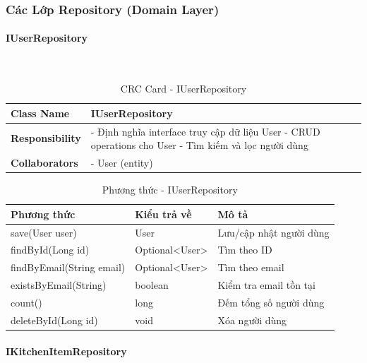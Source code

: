\subsubsection{Các Lớp Repository (Domain Layer)}

\paragraph{IUserRepository} ~\\

\begin{table}[H]
\small
\renewcommand{\arraystretch}{1.3}
\begin{tabularx}{\textwidth}{|>{\raggedright\arraybackslash}p{3.5cm}|X|}
\hline
\rowcolor{gray!20}
\textbf{Class Name} & IUserRepository \\
\hline
\textbf{Responsibility} & - Định nghĩa interface truy cập dữ liệu User \newline - CRUD operations cho User \newline - Tìm kiếm và lọc người dùng \\
\hline
\textbf{Collaborators} & - User (entity) \\
\hline
\end{tabularx}
\caption{CRC Card - IUserRepository}
\end{table}

\begin{table}[H]
\small
\renewcommand{\arraystretch}{1.3}
\begin{tabularx}{\textwidth}{|>{\raggedright\arraybackslash}p{5cm}|>{\raggedright\arraybackslash}p{3cm}|X|}
\hline
\rowcolor{gray!20}
\textbf{Phương thức} & \textbf{Kiểu trả về} & \textbf{Mô tả} \\
\hline
save(User user) & User & Lưu/cập nhật người dùng \\
\hline
findById(Long id) & Optional<User> & Tìm theo ID \\
\hline
findByEmail(String email) & Optional<User> & Tìm theo email \\
\hline
existsByEmail(String) & boolean & Kiểm tra email tồn tại \\
\hline
count() & long & Đếm tổng số người dùng \\
\hline
deleteById(Long id) & void & Xóa người dùng \\
\hline
\end{tabularx}
\caption{Phương thức - IUserRepository}
\end{table}

\paragraph{IKitchenItemRepository} ~\\

